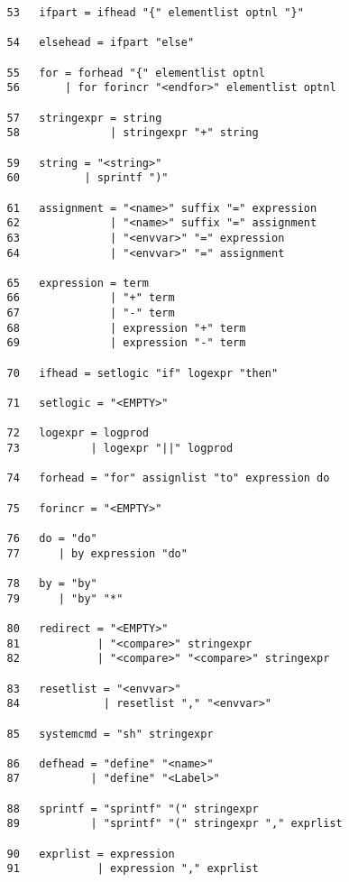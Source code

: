 \documentclass[11pt]{article}
\begin{document}
\begin{verbatim}
   53   ifpart = ifhead "{" elementlist optnl "}" 

   54   elsehead = ifpart "else" 

   55   for = forhead "{" elementlist optnl 
   56       | for forincr "<endfor>" elementlist optnl 

   57   stringexpr = string 
   58              | stringexpr "+" string 

   59   string = "<string>" 
   60          | sprintf ")" 

   61   assignment = "<name>" suffix "=" expression 
   62              | "<name>" suffix "=" assignment 
   63              | "<envvar>" "=" expression 
   64              | "<envvar>" "=" assignment 

   65   expression = term 
   66              | "+" term 
   67              | "-" term 
   68              | expression "+" term 
   69              | expression "-" term 

   70   ifhead = setlogic "if" logexpr "then" 

   71   setlogic = "<EMPTY>" 

   72   logexpr = logprod 
   73           | logexpr "||" logprod 

   74   forhead = "for" assignlist "to" expression do 

   75   forincr = "<EMPTY>" 

   76   do = "do" 
   77      | by expression "do" 

   78   by = "by" 
   79      | "by" "*" 

   80   redirect = "<EMPTY>" 
   81            | "<compare>" stringexpr 
   82            | "<compare>" "<compare>" stringexpr 

   83   resetlist = "<envvar>" 
   84             | resetlist "," "<envvar>" 

   85   systemcmd = "sh" stringexpr 

   86   defhead = "define" "<name>" 
   87           | "define" "<Label>" 

   88   sprintf = "sprintf" "(" stringexpr 
   89           | "sprintf" "(" stringexpr "," exprlist 

   90   exprlist = expression 
   91            | expression "," exprlist 


\end{verbatim}
\end{document}
